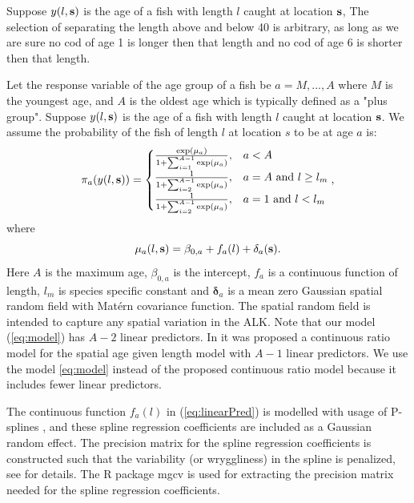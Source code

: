 \documentclass[a4paper 12pt]{article}
\numberwithin{equation}{section}
\begin{document}
Suppose $y(l,{\bf s})$ is the age of a fish with length $l$ caught at location ${\bf s}$, 
 The selection of separating the length above and below 40 is arbitrary, as long as we are sure no cod of age 1 is longer then that length and no cod of age 6 is shorter then that length. 


\indent Let the response variable of the age group of a fish be $a = M,...,A$ where $M$ is the youngest age, and $A$ is the oldest age which is typically defined as a "plus group". Suppose $y(l,{\bf s})$ is the age  of a fish with length $l$ caught at location ${\bf s}$. We assume the probability of the fish of length $l$ at location $s$ to be at age $a$ is:
\begin{equation}
\pi_a(y(l,{\bf s})) =
\begin{cases}
\frac{\exp(\mu_a)}{1+ \sum_{i = 1}^{A-1} \exp(\mu_a)} ,& a<A \\
\frac{1}{1+ \sum_{i = 2}^{A-1} \exp(\mu_a)},& a=A \text{ and } l \geq l_m \\
\frac{1}{1+ \sum_{i = 2}^{A-1} \exp(\mu_a)},& a=1 \text{ and } l<l_m
\end{cases},
\label{eq:model}
\end{equation}
where 
\begin{equation}\label{eq:linearPred}
\mu_a(l,{\bf s}) = \beta_{0,a} + f_a(l)  + \delta_a({\bf s}).
\end{equation}
Here $A$ is the maximum age, $\beta_{0,a}$ is the intercept, $f_a$ is a continuous function of length, $l_m$ is species specific constant and $\pmb{\delta}_a$ is a mean zero Gaussian spatial random field with Mat\'{e}rn covariance function. The spatial random field is intended to capture any spatial variation in the ALK. Note that our model (\ref{eq:model}) has $A-2$ linear predictors. In \citet{berg2012spatial} it was proposed a continuous ratio model for the spatial age given length model with $A-1$ linear predictors. We use the model \ref{eq:model} instead of the proposed continuous ratio model because it includes fewer linear predictors.

The continuous function $f_a(l)$ in (\ref{eq:linearPred}) is modelled with usage of P-splines \citep{wood2017generalized}, and these spline regression coefficients are included as a Gaussian random effect. The precision matrix for the spline regression coefficients is constructed such that the variability (or wryggliness) in the spline is penalized, see \citet[page 239]{wood2017generalized} for details. The R package mgcv \citep{wood2015package} is used for extracting the precision matrix needed for the spline regression coefficients.
\end{document}
